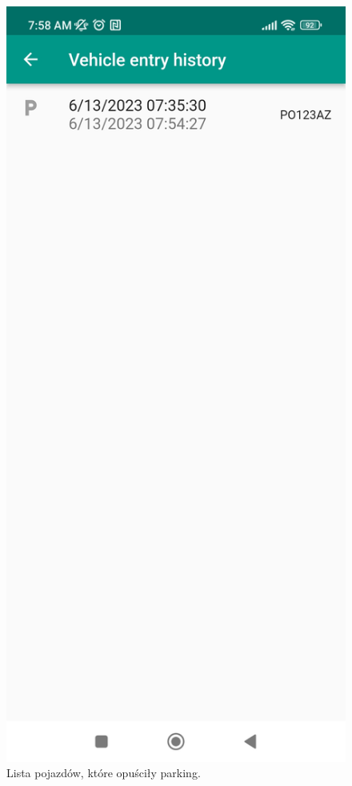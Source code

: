 \documentclass[a4paper, 11pt]{article}
\begin{document}
\begin{figure}
\begin{center}
\includegraphics[width=0.6\linewidth]{zakonczony.jpg}
\caption{Lista pojazdów, które opuściły parking.}
\end{center}
\end{figure}
\end{document}
